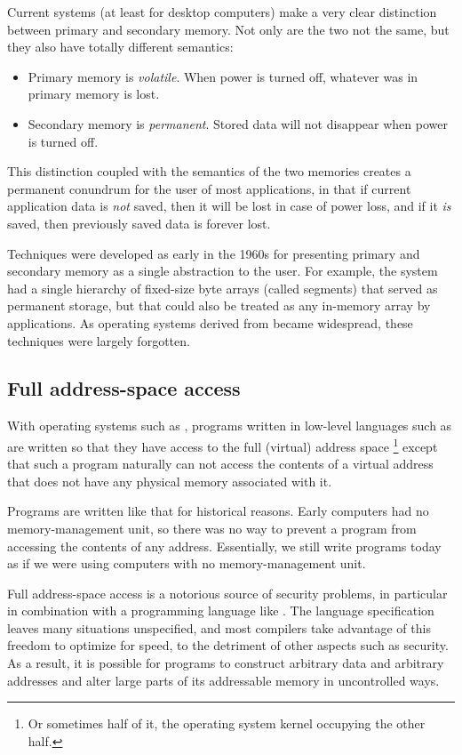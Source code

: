 Current systems (at least for desktop computers) make a very clear
distinction between primary and secondary memory.  Not only are the
two not the same, but they also have totally different semantics:
\begin{itemize}
\item Primary memory is \emph{volatile}.  When power is turned off,
    whatever was in primary memory is lost.
    \item Secondary memory is \emph{permanent}.  Stored data will not
    disappear when power is turned off.
\end{itemize}

This distinction coupled with the semantics of the two memories
creates a permanent conundrum for the user of most applications, in
that if current application data is \emph{not} saved, then it will
be lost in case of power loss, and if it \emph{is} saved, then
previously saved data is forever lost. 

Techniques were developed as early in the 1960s for presenting
primary and secondary memory as a single abstraction to the user.
For example, the \multics{} system had a single hierarchy of fixed-size
byte arrays (called segments) that served as permanent storage, but
that could also be treated as any in-memory array by applications.
As operating systems derived from \unix{} became widespread, these
techniques were largely forgotten. 

\subsection{Full address-space access}

With operating systems such as \unix{}, programs written in low-level
languages such as \clanguage{} are written so that they have access to
the full (virtual) address space%
\footnote{Or sometimes half of it, the operating system kernel
  occupying the other half.}
except that such a program naturally can not access the contents of a
virtual address that does not have any physical memory associated with
it.

Programs are written like that for historical reasons.  Early
computers had no memory-management unit, so there was no way to
prevent a program from accessing the contents of any address.
Essentially, we still write programs today as if we were using
computers with no memory-management unit.

Full address-space access is a notorious source of security problems,
in particular in combination with a programming language like
\clanguage{}.  The \clanguage{} language specification leaves many situations
unspecified, and most compilers take advantage of this freedom to
optimize for speed, to the detriment of other aspects such as
security.  As a result, it is possible for \clanguage{} programs to construct
arbitrary data and arbitrary addresses and alter large parts of its
addressable memory in uncontrolled ways.

